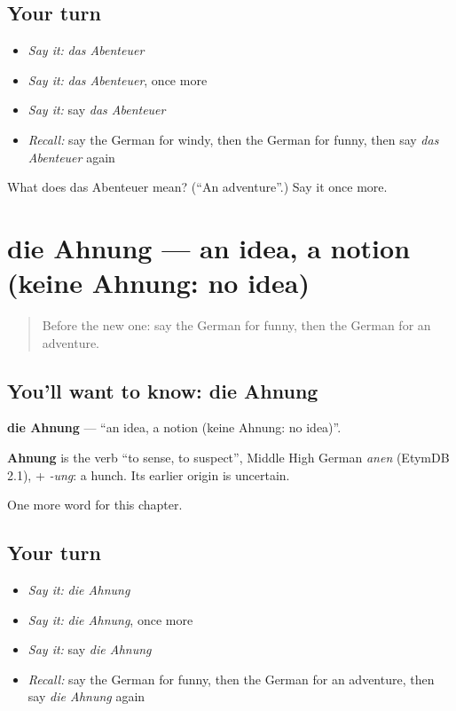 \subsection*{Your turn}
\begin{itemize}
\raggedright
  \item \emph{Say it:} \emph{das Abenteuer}
  \item \emph{Say it:} \emph{das Abenteuer}, once more
  \item \emph{Say it:} say \emph{das Abenteuer}
  \item \emph{Recall:} say the German for windy, then the German for funny, then say \emph{das Abenteuer} again
\end{itemize}

\begin{tcolorbox}[breakable,colback=teal!4,colframe=teal!35!black,title={Before you move on}]
What does das Abenteuer mean? (\textquotedblleft{}An adventure\textquotedblright{}.) Say it once more.
\end{tcolorbox}
\section[die Ahnung]{die Ahnung — an idea, a notion (keine Ahnung: no idea)}

\label{lesson:GE-C225-ahnung}



\begin{quote}
Before the new one: say the German for funny, then the German for an adventure.
\end{quote}

\subsection*{You'll want to know: die Ahnung}
\textbf{die Ahnung} — \textquotedblleft{}an idea, a notion (keine Ahnung: no idea)\textquotedblright{}.

\begin{cousinweb}
\textbf{Ahnung} is the verb \textquotedblleft{}to sense, to suspect\textquotedblright{}, Middle High German \emph{anen} (EtymDB 2.1), + \emph{-ung}: a hunch. Its earlier origin is uncertain.
\end{cousinweb}

\begin{grammarlens}[title={What you've built}]
One more word for this chapter.
\end{grammarlens}

\subsection*{Your turn}
\begin{itemize}
\raggedright
  \item \emph{Say it:} \emph{die Ahnung}
  \item \emph{Say it:} \emph{die Ahnung}, once more
  \item \emph{Say it:} say \emph{die Ahnung}
  \item \emph{Recall:} say the German for funny, then the German for an adventure, then say \emph{die Ahnung} again
\end{itemize}


